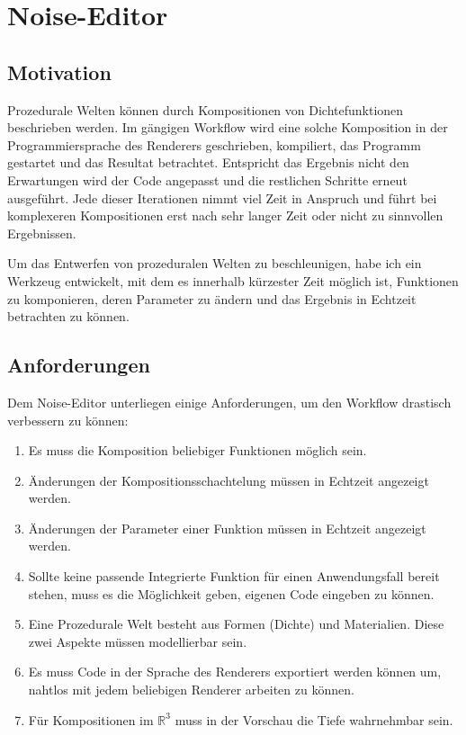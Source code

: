 \chapter{Noise-Editor}
\section{Motivation}
Prozedurale Welten können durch Kompositionen von Dichtefunktionen beschrieben werden. Im gängigen Workflow wird eine solche Komposition in der Programmiersprache des Renderers geschrieben, kompiliert, das Programm gestartet und das Resultat betrachtet. Entspricht das Ergebnis nicht den Erwartungen wird der Code angepasst und die restlichen Schritte erneut ausgeführt. Jede dieser Iterationen nimmt viel Zeit in Anspruch und führt bei komplexeren Kompositionen erst nach sehr langer Zeit oder nicht zu sinnvollen Ergebnissen.

Um das Entwerfen von prozeduralen Welten zu beschleunigen, habe ich ein Werkzeug entwickelt, mit dem es innerhalb kürzester Zeit möglich ist, Funktionen zu komponieren, deren Parameter zu ändern und das Ergebnis in Echtzeit betrachten zu können.

\section{Anforderungen}
Dem Noise-Editor unterliegen einige Anforderungen, um den Workflow drastisch verbessern zu können:
\begin{enumerate}
	\item Es muss die Komposition beliebiger Funktionen möglich sein.
	\item Änderungen der Kompositionsschachtelung müssen in Echtzeit angezeigt werden.
	\item Änderungen der Parameter einer Funktion müssen in Echtzeit angezeigt werden.
	\item Sollte keine passende Integrierte Funktion für einen Anwendungsfall bereit stehen, muss es die Möglichkeit geben, eigenen Code eingeben zu können.
	\item Eine Prozedurale Welt besteht aus Formen (Dichte) und Materialien. Diese zwei Aspekte müssen modellierbar sein.
	\item Es muss Code in der Sprache des Renderers exportiert werden können um, nahtlos mit jedem beliebigen Renderer arbeiten zu können.
	\item Für Kompositionen im $\mathbb{R}^3$ muss in der Vorschau die Tiefe wahrnehmbar sein.
\end{enumerate}

